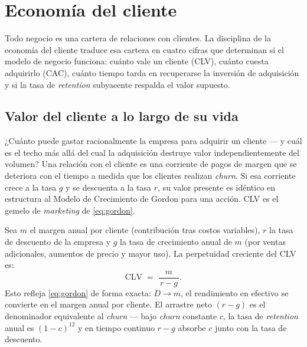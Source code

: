 \chapter{Economía del cliente}\label{ch:customer-economics}


Todo negocio es una cartera de relaciones con clientes. La disciplina de la economía del cliente traduce esa cartera en cuatro cifras que determinan si el modelo de negocio funciona: cuánto vale un cliente (CLV), cuánto cuesta adquirirlo (CAC), cuánto tiempo tarda en recuperarse la inversión de adquisición y si la tasa de \emph{retention} subyacente respalda el valor supuesto.

\section{Valor del cliente a lo largo de su vida}\label{sec:clv}

¿Cuánto puede gastar racionalmente la empresa para adquirir un cliente --- y cuál es el techo más allá del cual la adquisición destruye valor independientemente del volumen? Una relación con el cliente es una corriente de pagos de margen que se deteriora con el tiempo a medida que los clientes realizan \emph{churn}. Si esa corriente crece a la tasa \(g\) y se descuenta a la tasa \(r\), su valor presente es idéntico en estructura al Modelo de Crecimiento de Gordon para una acción. CLV es el gemelo de \emph{marketing} de \cref{eq:gordon}.

Sea \(m\) el margen anual por cliente (contribución tras costos variables), \(r\) la tasa de descuento de la empresa y \(g\) la tasa de crecimiento anual de \(m\) (por ventas adicionales, aumentos de precio y mayor uso). La perpetuidad creciente del CLV es:
\begin{equation}\label{eq:clv}
  \mathrm{CLV} \;=\; \frac{m}{\,r - g\,} .
\end{equation}
Esto refleja \cref{eq:gordon} de forma exacta: \(D \to m\), el rendimiento en efectivo se convierte en el margen anual por cliente. El arrastre neto \((r-g)\) es el denominador equivalente al \emph{churn} --- bajo \emph{churn} constante \(c\), la tasa de \emph{retention} anual es \((1-c)^{12}\) y en tiempo continuo \(r-g\) absorbe \(c\) junto con la tasa de descuento.


